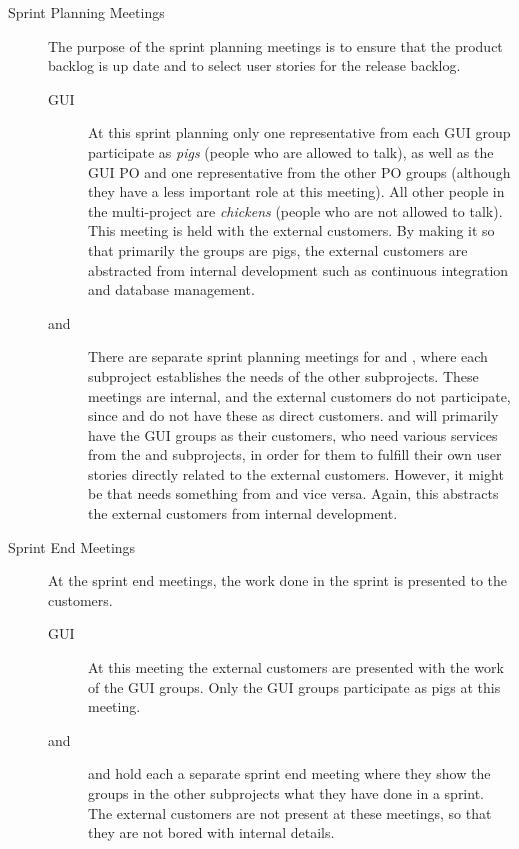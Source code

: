 \begin{description}
  \item[Sprint Planning Meetings]
  The purpose of the sprint planning meetings is to ensure that the product backlog is up date and to select user stories for the release backlog.
  \begin{description}
    \item[GUI] At this sprint planning only one representative from each GUI group participate as \emph{pigs} (people who are allowed to talk), as well as the GUI PO and one representative from the other PO groups (although they have a less important role at this meeting). All other people in the multi-project are \emph{chickens} (people who are not allowed to talk). This meeting is held with the external customers. By making it so that primarily the \gui groups are pigs, the external customers are abstracted from internal development such as continuous integration and database management.
    \item[\db and \bd] There are separate sprint planning meetings for \db and \bd, where each subproject establishes the needs of the other subprojects. These meetings are internal, and the external customers do not participate, since \db and \bd do not have these as direct customers. \db and \bd will primarily have the GUI groups as their customers, who need various services from the \db and \bd subprojects, in order for them to fulfill their own user stories directly related to the external customers. However, it might be that \db needs something from \bd and vice versa. Again, this abstracts the external customers from internal development.
  \end{description}
  \item[Sprint End Meetings]
  At the sprint end meetings, the work done in the sprint is presented to the customers.
  \begin{description}
    \item[GUI] At this meeting the external customers are presented with the work of the GUI groups. Only the GUI groups participate as pigs at this meeting.
    \item[\db and \bd] \db and \bd hold each a separate sprint end meeting where they show the groups in the other subprojects what they have done in a sprint. The external customers are not present at these meetings, so that they are not bored with internal details.
  \end{description}
\end{description}

